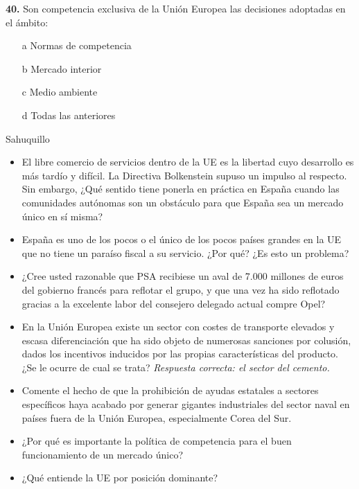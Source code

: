 \documentclass{nuevotema}
\begin{document}
\textbf{40.} Son competencia exclusiva de la Unión Europea las decisiones adoptadas en el ámbito:

\begin{itemize}
	\item[a] Normas de competencia
	\item[b] Mercado interior
	\item[c] Medio ambiente
	\item[d] Todas las anteriores
\end{itemize}




Sahuquillo

\begin{itemize}
    \item El libre comercio de servicios dentro de la UE es la libertad cuyo desarrollo es más tardío y difícil. La Directiva Bolkenstein supuso un impulso al respecto. Sin embargo, ¿Qué sentido tiene ponerla en práctica en España cuando las comunidades autónomas son un obstáculo para que España sea un mercado único en sí misma?
    \item España es uno de los pocos o el único de los pocos países grandes en la UE que no tiene un paraíso fiscal a su servicio. ¿Por qué? ¿Es esto un problema?
    \item ¿Cree usted razonable que PSA recibiese un aval de 7.000 millones de euros del gobierno francés para reflotar el grupo, y que una vez ha sido reflotado gracias a la excelente labor del consejero delegado actual compre Opel?
    \item En la Unión Europea existe un sector con costes de transporte elevados y escasa diferenciación que ha sido objeto de numerosas sanciones por colusión, dados los incentivos inducidos por las propias características del producto. ¿Se le ocurre de cual se trata? \textit{Respuesta correcta: el sector del cemento.}
    \item Comente el hecho de que la prohibición de ayudas estatales a sectores específicos haya acabado por generar gigantes industriales del sector naval en países fuera de la Unión Europea, especialmente Corea del Sur.
    \item ¿Por qué es importante la política de competencia para el buen funcionamiento de un mercado único?
    \item ¿Qué entiende la UE por posición dominante?
\end{itemize}

\notas
\end{document}

